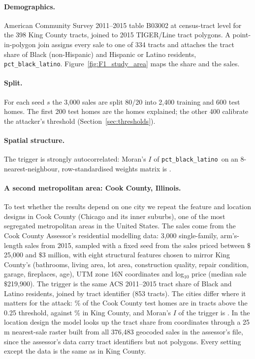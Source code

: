 \documentclass[11pt]{article}
\newcommand{\pct}{\texttt{pct\_black\_latino}}
\newcommand{\1}{\mathbf{1}}
\newcommand{\usd}{\ensuremath{\$}}
\begin{document}
\paragraph{Demographics.} American Community Survey 2011--2015 table B03002 at census-tract level for the 398 King
County tracts, joined to 2015 TIGER/Line tract polygons. A point-in-polygon join assigns every sale to one of 334
tracts and attaches the tract share of Black (non-Hispanic) and Hispanic or Latino residents, \pct. Figure~\ref{fig:F1_study_area}
maps the share and the sales.

\paragraph{Split.} For each seed $s$ the 3,000 sales are split 80/20 into 2,400 training and 600 test homes. The
first 200 test homes are the homes explained; the other 400 calibrate the attacker's threshold (Section~\ref{sec:thresholds}).

\paragraph{Spatial structure.} The trigger is strongly autocorrelated: Moran's $I$ of \pct\ on an
8-nearest-neighbour, row-standardised weights matrix is \TriggerMoran.

\paragraph{A second metropolitan area: Cook County, Illinois.} To test whether the results depend on one city we
repeat the feature and location designs in Cook County (Chicago and its inner suburbs), one of the most segregated
metropolitan areas in the United States. The sales come from the Cook County Assessor's residential modelling data:
3,000 single-family, arm's-length sales from 2015, sampled with a fixed seed from the sales priced between
\usd25{,}000 and \usd3 million, with eight structural features chosen to mirror King County's (bathrooms, living area, lot area,
construction quality, repair condition, garage, fireplaces, age), UTM zone 16N coordinates and log$_{10}$ price
(median sale \usd219{,}900). The trigger is the same ACS 2011--2015 tract share of Black and Latino residents, joined
by tract identifier (853 tracts). The cities differ where it matters for the attack: \SharePenCookFeature\% of the Cook
County test homes are in tracts above the 0.25 threshold, against \SharePenFeature\% in King County, and Moran's $I$ of the
trigger is \TriggerMoranCook. In the location design the model looks up the tract share from coordinates through a
25\,m nearest-sale raster built from all 376{,}483 geocoded sales in the assessor's file, since the assessor's data
carry tract identifiers but not polygons. Every setting except the data is the same as in King County.
\end{document}

